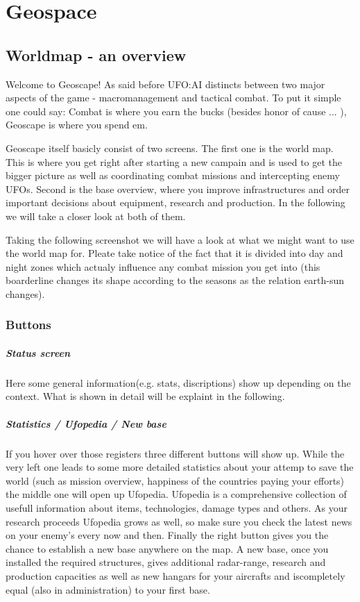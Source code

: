 
\chapter{Geospace}

\section{Worldmap - an overview} 
Welcome to Geoscape! As said before UFO:AI distincts between two major aspects of the game - macromanagement and tactical combat. To put it simple one could say: Combat is where you earn the bucks (besides honor of cause ... ), Geoscape is where you spend em.

Geoscape itself basicly consist of two screens. The first one is the world map. This is where you get right after starting a new campain and is used to get the bigger picture as well as coordinating combat missions and intercepting enemy UFOs. Second is the base overview, where you improve infrastructures and order important decisions about equipment, research and production. In the following we will take a closer look at both of them.

Taking the following screenshot we will have a look at what we might want to use the world map for.
Pleate take notice of the fact that it is divided into day and night zones which actualy influence any combat mission you get into (this boarderline changes its shape according to the seasons as the relation earth-sun changes).

\subsection{Buttons}
\paragraph*{Status screen}
Here some general information(e.g. stats, discriptions) show up depending on the context. What is shown in detail will be explaint in the following.
\paragraph*{Statistics / Ufopedia / New base}
If you hover over those registers three different buttons will show up. While the very left one leads to some more detailed statistics about your attemp to save the world (such as mission overview, happiness of the countries paying your efforts) the middle one will open up Ufopedia. Ufopedia is a comprehensive collection of usefull information about items, technologies, damage types and others. As your research proceeds Ufopedia grows as well, so make sure you check the latest news on your enemy's every now and then. Finally the right button gives you the chance to establish a new base anywhere on the map. A new base, once you installed the required structures, gives additional radar-range, research and production capacities as well as new hangars for your aircrafts and iscompletely equal (also in administration) to your first base.
